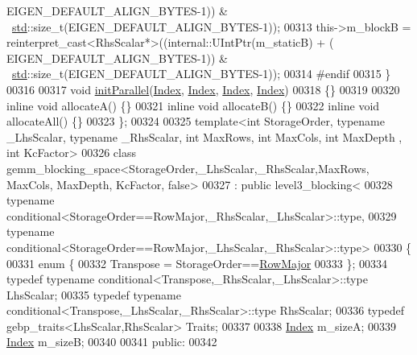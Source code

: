 \begin{DoxyCode}
      EIGEN\_DEFAULT\_ALIGN\_BYTES-1)) & ~\hyperlink{namespacestd}{std}::size\_t(EIGEN\_DEFAULT\_ALIGN\_BYTES-1));
00313       this->m\_blockB = \textcolor{keyword}{reinterpret\_cast<}RhsScalar*\textcolor{keyword}{>}((internal::UIntPtr(m\_staticB) + (
      EIGEN\_DEFAULT\_ALIGN\_BYTES-1)) & ~\hyperlink{namespacestd}{std}::size\_t(EIGEN\_DEFAULT\_ALIGN\_BYTES-1));
00314 \textcolor{preprocessor}{#endif}
00315     \}
00316 
00317     \textcolor{keywordtype}{void} \hyperlink{namespace_eigen_a820c0e0460934cc17eb6dacbad54a9f5}{initParallel}(\hyperlink{namespace_eigen_a62e77e0933482dafde8fe197d9a2cfde}{Index}, \hyperlink{namespace_eigen_a62e77e0933482dafde8fe197d9a2cfde}{Index}, \hyperlink{namespace_eigen_a62e77e0933482dafde8fe197d9a2cfde}{Index}, \hyperlink{namespace_eigen_a62e77e0933482dafde8fe197d9a2cfde}{Index})
00318     \{\}
00319 
00320     \textcolor{keyword}{inline} \textcolor{keywordtype}{void} allocateA() \{\}
00321     \textcolor{keyword}{inline} \textcolor{keywordtype}{void} allocateB() \{\}
00322     \textcolor{keyword}{inline} \textcolor{keywordtype}{void} allocateAll() \{\}
00323 \};
00324 
00325 \textcolor{keyword}{template}<\textcolor{keywordtype}{int} StorageOrder, \textcolor{keyword}{typename} \_LhsScalar, \textcolor{keyword}{typename} \_RhsScalar, \textcolor{keywordtype}{int} MaxRows, \textcolor{keywordtype}{int} MaxCols, \textcolor{keywordtype}{int} MaxDepth
      , \textcolor{keywordtype}{int} KcFactor>
00326 \textcolor{keyword}{class }gemm\_blocking\_space<StorageOrder,\_LhsScalar,\_RhsScalar,MaxRows, MaxCols, MaxDepth, KcFactor, false>
00327   : \textcolor{keyword}{public} level3\_blocking<
00328       typename conditional<StorageOrder==RowMajor,\_RhsScalar,\_LhsScalar>::type,
00329       typename conditional<StorageOrder==RowMajor,\_LhsScalar,\_RhsScalar>::type>
00330 \{
00331     \textcolor{keyword}{enum} \{
00332       Transpose = StorageOrder==\hyperlink{group__enums_ggaacded1a18ae58b0f554751f6cdf9eb13acfcde9cd8677c5f7caf6bd603666aae3}{RowMajor}
00333     \};
00334     \textcolor{keyword}{typedef} \textcolor{keyword}{typename} conditional<Transpose,\_RhsScalar,\_LhsScalar>::type LhsScalar;
00335     \textcolor{keyword}{typedef} \textcolor{keyword}{typename} conditional<Transpose,\_LhsScalar,\_RhsScalar>::type RhsScalar;
00336     \textcolor{keyword}{typedef} gebp\_traits<LhsScalar,RhsScalar> Traits;
00337 
00338     \hyperlink{namespace_eigen_a62e77e0933482dafde8fe197d9a2cfde}{Index} m\_sizeA;
00339     \hyperlink{namespace_eigen_a62e77e0933482dafde8fe197d9a2cfde}{Index} m\_sizeB;
00340 
00341   \textcolor{keyword}{public}:
00342 

\end{DoxyCode}
